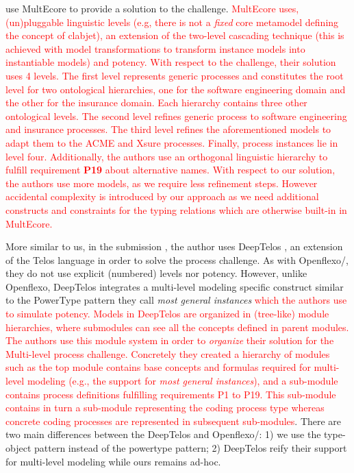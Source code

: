 \cite{multiecore2019} use MultEcore \citep{multecore2016} to provide a solution to the challenge. \textcolor{red}{MultEcore uses, (un)pluggable linguistic levels (e.g, there is not a \emph{fixed} core metamodel defining the concept of clabjet), an extension of the two-level cascading technique \citep{atkinson2005concepts} (this is achieved with model transformations to transform instance models into instantiable models) and potency. With respect to the challenge, their solution uses 4 levels. The first level represents generic processes and constitutes the root level for two ontological hierarchies, one for the software engineering domain and the other for the insurance domain. Each hierarchy contains three other ontological levels. The second level refines generic process to software engineering and insurance processes. The third level refines the aforementioned models to adapt them to the ACME and Xsure processes. Finally, process instances lie in level four. Additionally, the authors use an orthogonal linguistic hierarchy to fulfill requirement \textbf{P19} about alternative names. With respect to our solution, the authors use more models, as we require less refinement steps. However accidental complexity is introduced by our approach as we need additional constructs and constraints for the typing relations which are otherwise built-in in MultEcore.} 


More similar to us, in the submission \parencite{deeptelos2019}, the author uses DeepTelos \parencite{deeptelos2016}, an extension of the Telos language \parencite{telos1990} in order to solve the process challenge. As with Openflexo/\FML, they do not use explicit (numbered) levels nor potency. However, unlike Openflexo, DeepTelos integrates a multi-level modeling specific construct similar to the PowerType \parencite{atkinson2001essence} pattern they call \emph{most general instances} \textcolor{red}{which the authors use to simulate potency. Models in DeepTelos are organized in (tree-like) module hierarchies, where submodules can see all the concepts defined in parent modules. The authors use this module system in order to \emph{organize} their solution for the Multi-level process challenge. Concretely they created a hierarchy of modules such as the top module contains base concepts and formulas required for multi-level modeling (e.g., the support for \emph{most general instances}), and a sub-module contains process definitions fulfilling requirements P1 to P19. This sub-module contains in turn a sub-module representing the coding process type whereas concrete coding processes are represented in subsequent sub-modules}. There are two main differences between the DeepTelos and Openflexo/\FML: 1) we use the type-object pattern instead of the powertype pattern; 2) DeepTelos reify their support for multi-level modeling while ours remains ad-hoc.

